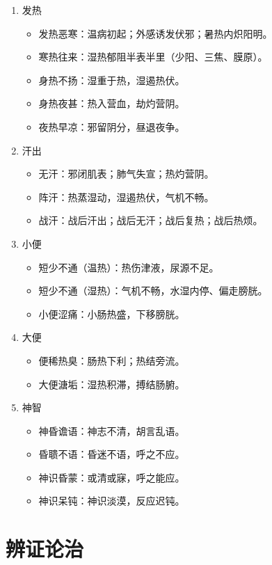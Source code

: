 \documentclass[cn,black,12pt,founder,normal,twocolumn]{elegantnote}
\begin{document}
\begin{enumerate}
    \item 发热
    \begin{itemize}
        \item 发热恶寒：温病初起；外感诱发伏邪；暑热内炽阳明。
        \item 寒热往来：湿热郁阻半表半里（少阳、三焦、膜原）。
        \item 身热不扬：湿重于热，湿遏热伏。
        \item 身热夜甚：热入营血，劫灼营阴。
        \item 夜热早凉：邪留阴分，昼退夜争。
    \end{itemize}
    \item 汗出
    \begin{itemize}
        \item 无汗：邪闭肌表；肺气失宣；热灼营阴。
        \item 阵汗：热蒸湿动，湿遏热伏，气机不畅。
        \item 战汗：战后汗出；战后无汗；战后复热；战后热烦。
    \end{itemize}
    \item 小便
    \begin{itemize}
        \item 短少不通（温热）：热伤津液，尿源不足。
        \item 短少不通（湿热）：气机不畅，水湿内停、偏走膀胱。
        \item 小便涩痛：小肠热盛，下移膀胱。
    \end{itemize}
    \item 大便
    \begin{itemize}
        \item 便稀热臭：肠热下利；热结旁流。
        \item 大便溏垢：湿热积滞，搏结肠腑。
    \end{itemize}
    \item 神智
    \begin{itemize}
        \item 神昏谵语：神志不清，胡言乱语。
        \item 昏聩不语：昏迷不语，呼之不应。
        \item 神识昏蒙：或清或寐，呼之能应。
        \item 神识呆钝：神识淡漠，反应迟钝。
    \end{itemize}
\end{enumerate}

\section{辨证论治}
\end{document}
